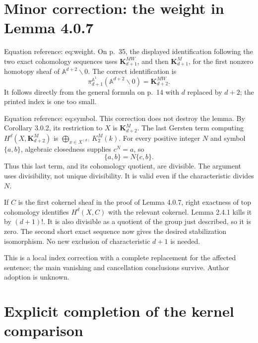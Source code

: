 \documentclass[10pt]{article}
\begin{document}
\section*{Minor correction: the weight in Lemma 4.0.7}
Equation reference: eq:weight. On p. 35, the displayed identification following the two exact cohomology sequences uses \(\mathbf K_{d+1}^{MW}\), and then \(\mathbf K_{d+1}^M\), for the first nonzero homotopy sheaf of \(\mathbb A^{d+2}\smallsetminus0\). The correct identification is \[
 \pi^{\mathbb A^1}_{d+1}(\mathbb A^{d+2}\smallsetminus0)=\mathbf K_{d+2}^{MW}.\] It follows directly from the general formula on p. 14 with \(d\) replaced by \(d+2\); the printed index is one too small.\par
Equation reference: eq:symbol. This correction does not destroy the lemma. By Corollary 3.0.2, its restriction to \(X\) is \(\mathbf K_{d+2}^M\). The last Gersten term computing \(H^d(X,\mathbf K_{d+2}^M)\) is \(\bigoplus_{x\in X^{(d)}}K_2^M(k)\). For every positive integer \(N\) and symbol \(\{a,b\}\), algebraic closedness supplies \(c^N=a\), so \[
 \{a,b\}=N\{c,b\}.\] Thus this last term, and its cohomology quotient, are divisible. The argument uses divisibility, not unique divisibility. It is valid even if the characteristic divides \(N\).\par
If \(C\) is the first cokernel sheaf in the proof of Lemma 4.0.7, right exactness of top cohomology identifies \(H^d(X,C)\) with the relevant cokernel. Lemma 2.4.1 kills it by \((d+1)!\). It is also divisible as a quotient of the group just described, so it is zero. The second short exact sequence now gives the desired stabilization isomorphism. No new exclusion of characteristic \(d+1\) is needed.\par
This is a local index correction with a complete replacement for the affected sentence; the main vanishing and cancellation conclusions survive. Author adoption is unknown.\par
\section*{Explicit completion of the kernel comparison}
\end{document}
